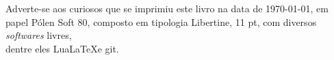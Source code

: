 \pagebreak

\ifodd\thepage\blankpage\fi

\parindent=0pt
\footnotesize\thispagestyle{empty}









\mbox{}\vfill
\begin{center}
		\begin{minipage}{.7\textwidth}\tiny\noindent{}
		\centering\tiny
Adverte-se aos curiosos que se imprimiu este livro na data de \today, em papel 
		Pólen Soft 80, composto em tipologia Libertine, 11 pt, 
		com diversos \textit{softwares} livres,\\
		dentre eles Lua\LaTeX e git.\\ 
		\medskip\\\
		\end{minipage}
\end{center}
